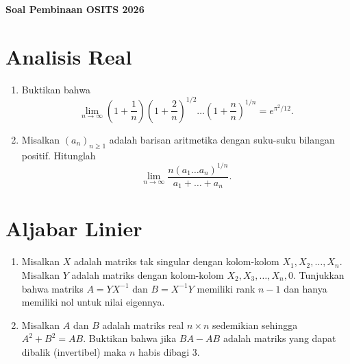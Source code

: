 \documentclass[11pt,a4paper]{article}
\begin{document}
\begin{center}
  \Large\textbf{Soal Pembinaan OSITS 2026}
\end{center}
\vspace{0.5cm}

\section*{Analisis Real}
\begin{enumerate}[label=\arabic*.]
  \item %
        Buktikan bahwa
        \[
          \lim_{n \to \infty} \left(1+\frac{1}{n}\right) \left(1+\frac{2}{n}\right)^{1/2} \dots \left(1+\frac{n}{n}\right)^{1/n} = e^{\pi^2/12}.
        \]

  \item %
        Misalkan $(a_n)_{n \ge 1}$ adalah barisan aritmetika dengan suku-suku bilangan positif. Hitunglah
        \[
          \lim_{n \to \infty} \frac{n(a_1 \dots a_n)^{1/n}}{a_1 + \dots + a_n}.
        \]
\end{enumerate}

\section*{Aljabar Linier}
\begin{enumerate}[label=\arabic*.]
  \item %
        Misalkan $X$ adalah matriks tak singular dengan kolom-kolom $X_1, X_2, \ldots, X_n$. Misalkan $Y$ adalah matriks dengan kolom-kolom $X_2, X_3, \ldots, X_n, 0$. Tunjukkan bahwa matriks $A = YX^{-1}$ dan $B = X^{-1}Y$ memiliki rank $n - 1$ dan hanya memiliki nol untuk nilai eigennya.

  \item %
        Misalkan $A$ dan $B$ adalah matriks real $n \times n$ sedemikian sehingga $A^2 + B^2 = AB$. Buktikan bahwa jika $BA - AB$ adalah matriks yang dapat dibalik (invertibel) maka $n$ habis dibagi 3.
\end{enumerate}
\end{document}
